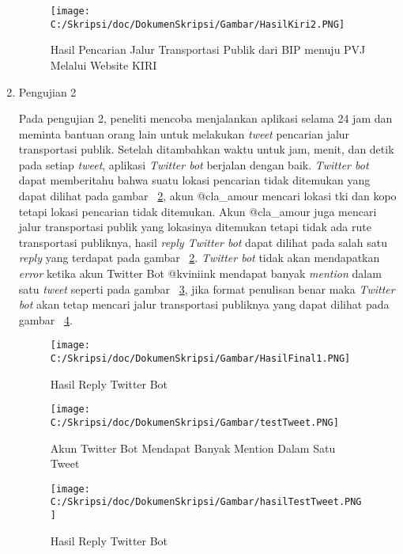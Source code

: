 \begin{enumerate}
	\begin{figure}
		\centering
			\texttt{[image: C:/Skripsi/doc/DokumenSkripsi/Gambar/HasilKiri2.PNG]}
		\caption{Hasil Pencarian Jalur Transportasi Publik dari BIP menuju PVJ Melalui Website KIRI}
		\label{fig:HasilKiri2}
	\end{figure}
	\clearpage
	
	\item Pengujian 2
	
	Pada pengujian 2, peneliti mencoba menjalankan aplikasi selama 24 jam dan meminta bantuan orang lain untuk melakukan \textit{tweet} pencarian jalur transportasi publik. Setelah ditambahkan waktu untuk jam, menit, dan detik pada setiap \textit{tweet}, aplikasi \textit{Twitter bot} berjalan dengan baik. \textit{Twitter bot} dapat memberitahu bahwa suatu lokasi pencarian tidak ditemukan yang dapat dilihat pada gambar ~\ref{fig:HasilFinal1}, akun @cla\_amour mencari lokasi tki dan kopo tetapi lokasi pencarian tidak ditemukan. Akun @cla\_amour juga mencari jalur transportasi publik yang lokasinya ditemukan tetapi tidak ada rute transportasi publiknya, hasil \textit{reply Twitter bot} dapat dilihat pada salah satu \textit{reply} yang terdapat pada gambar ~\ref{fig:HasilFinal1}. \textit{Twitter bot} tidak akan mendapatkan \textit{error} ketika akun Twitter Bot @kviniink mendapat banyak \textit{mention} dalam satu \textit{tweet} seperti pada gambar ~\ref{fig:testTweet}, jika format penulisan benar maka \textit{Twitter bot} akan tetap mencari jalur transportasi publiknya yang dapat dilihat pada gambar ~\ref{fig:hasilTestTweet}.
	
	
	\begin{figure}
		\centering
			\texttt{[image: C:/Skripsi/doc/DokumenSkripsi/Gambar/HasilFinal1.PNG]}
		\caption{Hasil Reply Twitter Bot}
		\label{fig:HasilFinal1}
	\end{figure}
	
	\begin{figure}
		\centering
			\texttt{[image: C:/Skripsi/doc/DokumenSkripsi/Gambar/testTweet.PNG]}
		\caption{Akun Twitter Bot Mendapat Banyak Mention Dalam Satu Tweet}
		\label{fig:testTweet}
	\end{figure}
	
	
	\begin{figure}
		\centering
			\texttt{[image: C:/Skripsi/doc/DokumenSkripsi/Gambar/hasilTestTweet.PNG]}
		\caption{Hasil Reply Twitter Bot}
		\label{fig:hasilTestTweet}
	\end{figure}


\end{enumerate}
